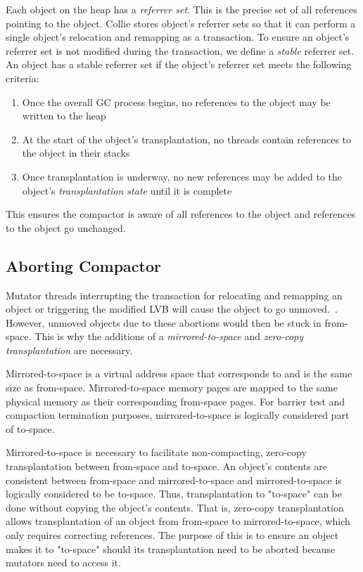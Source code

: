 \documentclass{sig-alternate}
\begin{document}
Each object on the heap has a \emph{referrer set}. This is the precise set 
of all references pointing to the object. Collie stores object's referrer sets
so that it can perform a single object's relocation and remapping as a transaction.
To ensure an object's referrer set is not modified during the transaction,
we define a \emph{stable} referrer set. An object has a stable referrer 
set if the object's referrer set meets the following criteria:
\begin{enumerate}
\item Once the overall GC process begins, no references to the object may be written to the heap
\item At the start of the object's transplantation, no threads contain references to the object in their stacks
\item Once transplantation is underway, no new references may be added to the object's \emph{transplantation state} until it is complete
\end{enumerate}
This ensures the compactor is aware of all references to the object
and references to the object go unchanged.


\subsection{Aborting Compactor}
\label{sec:collieAbortion}

Mutator threads interrupting the transaction for relocating and remapping
an object or triggering the modified LVB will cause the object to go unmoved.~\cite{Iyengar:Collie}.
However, unmoved objects due to these abortions would then be stuck
in from-space. This is why
the additions of a \emph{mirrored-to-space} and \emph{zero-copy transplantation} are necessary.

Mirrored-to-space is a virtual address space that corresponds to and is the same
size as from-space. Mirrored-to-space memory pages are mapped to the same physical
memory as their corresponding from-space pages. For barrier test and compaction 
termination purposes, mirrored-to-space is logically considered part of to-space.

Mirrored-to-space is necessary to facilitate non-compacting, zero-copy transplantation 
between from-space and to-space. An object's contents are 
consistent between from-space and mirrored-to-space and mirrored-to-space
is logically considered to be to-space. Thus, transplantation to "to-space"
can be done without copying the object's contents. That is, zero-copy transplantation
allows transplantation of an object from from-space to mirrored-to-space, which only
requires correcting references. The purpose of this is to ensure
an object makes it to "to-space" should its transplantation need 
to be aborted because mutators need to access it.
\end{document}
